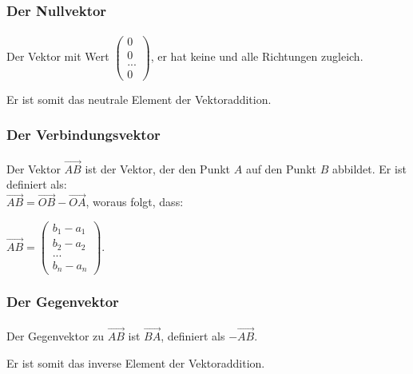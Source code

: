 \subsubsection{Der Nullvektor}
\paragraph{} Der Vektor mit Wert $\left(\begin{array}{c} 0 \\ 0 \\ ...\\0\end{array}\right)$, er hat keine und alle Richtungen zugleich.
\begin{Bemerkung}
Er ist somit das neutrale Element der Vektoraddition.
\end{Bemerkung}

\subsubsection{Der Verbindungsvektor}

\paragraph{} Der Vektor $\vec{AB}$ ist der Vektor, der den Punkt $A$ auf den Punkt $B$ abbildet. Er ist definiert als:\\ $\vec{AB}=\vec{OB}-\vec{OA}$, woraus folgt, dass: \begin{center} $\vec{AB} = \left(\begin{array}{c} b_1 - a_1 \\ b_2 - a_2 \\ ... \\ b_n - a_n \end{array}\right)$. \end{center}

\subsubsection{Der Gegenvektor}

\paragraph{} Der Gegenvektor zu $\vec{AB}$ ist $\vec{BA}$, definiert als  $-\vec{AB}$.
\begin{Bemerkung}
Er ist somit das inverse Element der Vektoraddition.
\end{Bemerkung}

